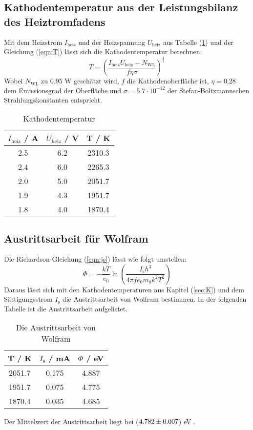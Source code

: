 \subsection{Kathodentemperatur aus der Leistungsbilanz des Heiztromfadens}
\label{sec:L}
Mit dem Heizstrom $I_\text{heiz}$ und der Heizspannung $U_\text{heiz}$ aus Tabelle (\ref{tab:heiz}) und der Gleichung (\ref{eqn:T}) lässt sich die Kathodentemperatur berechnen.
\begin{equation}
  T = \left(\frac{I_\text{heiz} U_\text{heiz} - N_\text{WL}}{f \eta \sigma}\right)^{\frac{1}{4}}
  \label{eqn:T}
\end{equation}
Wobei $N_\text{WL}$ zu 0.95 W geschätzt wird, $f$ die Kathodenoberfläche ist, $\eta = 0.28$ dem Emissionsgrad der Oberfläche und $\sigma = 5.7 \cdot 10^{-12}$ der Stefan-Boltzmannschen Strahlungskonstanten entspricht.

\begin{table}[H]
  \centering
  \begin{tabular}{c c c}
    \toprule
    $I_\text{heiz}$ / A & $U_\text{heiz}$ / V & T / K \\
    \midrule
    2.5 & 6.2 & 2310.3 \\
    2.4 & 6.0 & 2265.3 \\
    2.0 & 5.0 & 2051.7 \\
    1.9 & 4.3 & 1951.7 \\
    1.8 & 4.0 & 1870.4 \\
    \bottomrule
  \end{tabular}
  \caption{Kathodentemperatur}
  \label{tab:heiz}
\end{table}

\subsection{Austrittsarbeit für Wolfram}
Die Richardson-Gleichung (\ref{eqn:js}) lässt wie folgt umstellen:
\begin{equation}
  \Phi = - \frac{k T}{e_0} \ln \left(\frac{I_\text{s} h^3}{4 \pi f e_0 m_0 k^2 T^2}\right)
\end{equation}
Daraus lässt sich mit den Kathodentemperaturen aus Kapitel (\ref{sec:K}) und dem Sättigungsstrom $I_\text{s}$ die Austrittsarbeit von Wolfram bestimmen. In der folgenden Tabelle ist die Austrittsarbeit aufgelistet.

\begin{table}[H]
  \centering
  \begin{tabular}{c c c}
    \toprule
    T / K & $I_\text{s}$ / mA & $\Phi$ / eV \\
    \midrule
    2051.7 & 0.175 & 4.887 \\
    1951.7 & 0.075 & 4.775 \\
    1870.4 & 0.035 & 4.685 \\
    \bottomrule
  \end{tabular}
  \caption{Die Austrittsarbeit von Wolfram}
  \label{tab:}
\end{table}

Der Mittelwert der Austrittsarbeit liegt bei ($\num{4.782 +- 0.007}$) eV .
